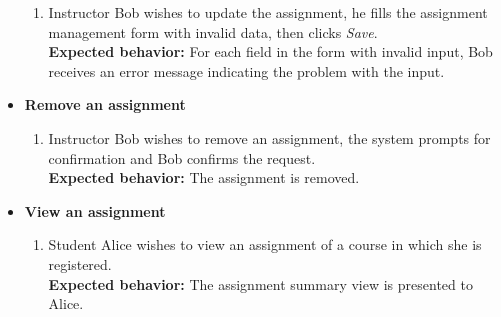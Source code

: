 \begin{itemize}
\begin{enumerate}
        \item Instructor Bob wishes to update the assignment, he fills the
            assignment management form with invalid data, then clicks \emph{Save}. \\
        {\bf Expected behavior:} For each field in the form with invalid input,
            Bob receives an error message indicating the problem with the
            input.
            \baselineskip
    \end{enumerate}

    \item \textbf{Remove an assignment} \begin{enumerate}
        \item Instructor Bob wishes to remove an assignment, the system
            prompts for confirmation and Bob confirms the request. \\
        {\bf Expected behavior:} The assignment is removed.
    \end{enumerate}

    \item \textbf{View an assignment} \begin{enumerate}
        \item Student Alice wishes to view an assignment of a course in which
            she is registered. \\
        {\bf Expected behavior:} The assignment summary view is presented to
            Alice.
    \end{enumerate}
\end{itemize}

